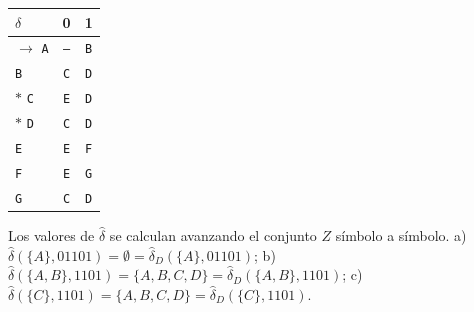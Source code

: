 \documentclass[11pt]{article}
\begin{document}
\begin{center}\small\begin{tabular}{lcc}\toprule
$\delta$ & 0 & 1 \\\midrule
$\to$ \texttt{A} & \texttt{--} & \texttt{B} \\
 \texttt{B} & \texttt{C} & \texttt{D} \\
$*$ \texttt{C} & \texttt{E} & \texttt{D} \\
$*$ \texttt{D} & \texttt{C} & \texttt{D} \\
 \texttt{E} & \texttt{E} & \texttt{F} \\
 \texttt{F} & \texttt{E} & \texttt{G} \\
 \texttt{G} & \texttt{C} & \texttt{D} \\
\bottomrule\end{tabular}\end{center}
Los valores de $\hat\delta$ se calculan avanzando el conjunto $Z$ símbolo a símbolo.
\resp a) $\hat\delta(\{A\}, 01101) = ∅ = \hat\delta_D(\{A\}, 01101)$; b) $\hat\delta(\{A, B\}, 1101) = \{A, B, C, D\} = \hat\delta_D(\{A, B\}, 1101)$; c) $\hat\delta(\{C\}, 1101) = \{A, B, C, D\} = \hat\delta_D(\{C\}, 1101)$.
\end{document}
